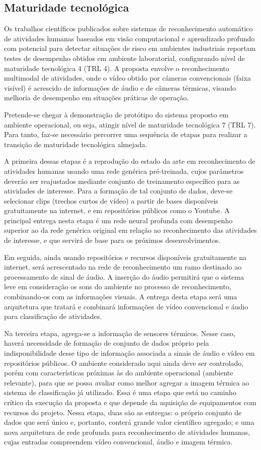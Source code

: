 \subsection{Maturidade tecnológica}
\label{ssec:trl}
Os trabalhos científicos publicados sobre sistemas de reconhecimento automático de atividades humanas baseados em visão computacional e aprendizado profundo com potencial para detectar situações de risco em ambientes industriais reportam testes de desempenho obtidos em ambiente laboratorial, configurando nível de maturidade tecnológica 4 (TRL 4). A proposta envolve o reconhecimento multimodal de atividades, onde o vídeo obtido por câmeras convencionais (faixa visível) é acrescido de informações de áudio e de câmeras térmicas, visando melhoria de desempenho em situações práticas de operação.

Pretende-se chegar à demonstração de protótipo do sistema proposto em ambiente operacional, ou seja, atingir nível de maturidade tecnológica 7 (TRL 7). Para tanto, faz-se necessário percorrer uma sequência de etapas para realizar a transição de maturidade tecnológica almejada.

A primeira dessas etapas é a reprodução do estado da arte em reconhecimento de atividades humanas usando uma rede genérica pré-treinada, cujos parâmetros deverão ser reajustados mediante conjunto de treinamento específico para as atividades de interesse. Para a formação de tal conjunto de dados, deve-se selecionar clips (trechos curtos de vídeo) a partir de bases disponíveis gratuitamente na internet, e em repositórios públicos como o Youtube. A principal entrega nesta etapa é um rede neural profunda com desempenho superior ao da rede genérica original em relação ao reconhecimento das atividades de interesse, e que servirá de base para os próximos desenvolvimentos.

Em seguida, ainda usando repositórios e recursos disponíveis gratuitamente na internet, será acrescentado na rede de reconhecimento um ramo destinado ao processamento de sinal de áudio. A inserção do áudio permitirá que o sistema leve em consideração os sons do ambiente no processo de reconhecimento, combinando-os com as informações visuais. A entrega desta etapa será uma arquitetura que tratará e combinará informações de vídeo convencional e áudio para classificação de atividades. 

Na terceira etapa, agrega-se a informação de sensores térmicos. Nesse caso, haverá necessidade de formação de conjunto de dados próprio pela indisponibilidade desse tipo de informação associada a sinais de áudio e vídeo em repositórios públicos. O ambiente considerado aqui ainda deve ser controlado, porém com características próximas às do ambiente operacional (ambiente relevante), para que se possa avaliar como melhor agregar a imagem térmica ao sistema de classificação já utilizado. Essa é uma etapa que está no caminho crítico da execução da proposta e que depende da aquisição de equipamentos com recursos do projeto. Nessa etapa, duas são as entregas: o próprio conjunto de dados que será único e, portanto, conterá grande valor científico agregado; e uma nova arquitetura de rede profunda para reconhecimento de atividades humanas, cujas entradas compreendem vídeo convencional, áudio e imagem térmica.


